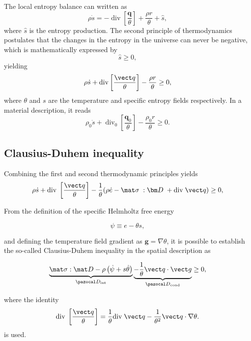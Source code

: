 The local entropy balance can written as
\begin{equation}
  \rho \dot s = -\operatorname{div}\left[\frac{\bm q}{\theta}\right] + \frac{\rho r}{\theta} + \hat{s},
\end{equation}
where \(\hat{s}\) is the entropy production.
The second principle of thermodynamics postulates that the changes in the entropy in the universe can never be negative, which is mathematically expressed by
\begin{equation}
  \hat s \geq 0,
\end{equation}
yielding
\begin{equation}
    \rho\dot s +\text{div}\left[\frac{\vect q}{\theta}\right] -\frac{\rho r}{\theta} \geq 0,
\end{equation}
   where $\theta$ and $s$ are the temperature and specific entropy fields respectively.
In a material description, it reads
\begin{equation}
  \rho_0 \dot s + \operatorname{div}_0 \left[\frac{\bm q_0}{\theta}\right] - \frac{\rho_0 r}{\theta} \geq 0.
\end{equation}

\subsection{Clausius-Duhem inequality}

Combining the first and second thermodynamic principles yields
\begin{equation}
    \rho\dot s + \text{div}\;\left[\frac{\vect q}{\theta}\right] -\frac{1}{\theta}(\rho\dot e -\mat\sigma\;:\bm D\; +\text{div}\;\vect q)\geq 0,
\end{equation}

From the definition of the specific Helmholtz free energy
\begin{highlight}
\begin{equation} \label{eq:def_helmholtz_free_energy}
    \psi \equiv e -\theta s,
\end{equation}
\end{highlight}
and defining the temperature field gradient as $\bm g=\nabla \theta$, it is possible to establish the so-called Clausius-Duhem inequality in the spatial description as
\begin{highlight}
    \begin{equation} \label{eq:clasius_duhem_eq}
        \underbrace{\mat \sigma:\mat D - \rho\left(\dot \psi +s\dot \theta\right)}_{\pazocal D_\text{int}} \underbrace{-\frac{1}{\theta}\vect q\cdot \vect g }_{\pazocal D_\text{cond}}\geq 0,
    \end{equation}
\end{highlight}
where the identity
\begin{equation}
    \text{div}\;\left[\frac{\vect q}{\theta}\right] =\frac{1}{\theta}\text{div}\;\vect q -\frac{1}{\theta^2}\vect q\cdot \nabla \theta.
\end{equation}
is used.

